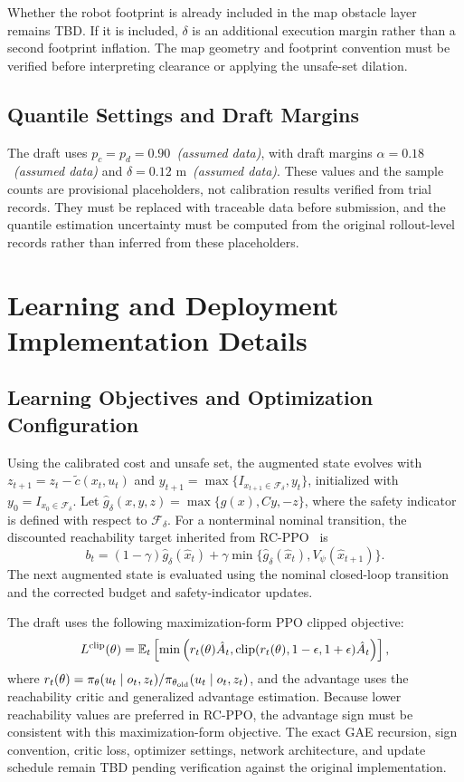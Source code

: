 \documentclass{article}
\begin{document}
Whether the robot footprint is already included in the map obstacle layer remains
\textsc{TBD}. If it is included, $\delta$ is an additional execution margin rather
than a second footprint inflation. The map geometry and footprint convention must
be verified before interpreting clearance or applying the unsafe-set dilation.

\subsection{Quantile Settings and Draft Margins}
The draft uses $p_c=p_d=0.90$~\textit{(assumed data)}, with draft margins
$\alpha=0.18$~\textit{(assumed data)} and $\delta=0.12$ m~\textit{(assumed data)}.
These values and the sample counts are provisional placeholders, not calibration
results verified from trial records. They must be replaced with traceable data
before submission, and the quantile estimation uncertainty must be computed from
the original rollout-level records rather than inferred from these placeholders.

\section{Learning and Deployment Implementation Details}
\label{app:learning_details}
\subsection{Learning Objectives and Optimization Configuration}
Using the calibrated cost and unsafe set, the augmented state evolves with
$z_{t+1}=z_t-\tilde c(x_t,u_t)$ and
$y_{t+1}=\max\{I_{x_{t+1}\in\mathcal{F}_\delta},y_t\}$, initialized with
$y_0=I_{x_0\in\mathcal{F}_\delta}$. Let
$\hat g_\delta(x,y,z)=\max\{g(x),Cy,-z\}$, where the safety indicator is defined
with respect to $\mathcal{F}_\delta$. For a nonterminal nominal transition,
the discounted reachability target inherited from RC-PPO~\citep{so2024} is
\begin{equation}
b_t=(1-\gamma)\hat g_\delta(\hat x_t)+\gamma\min\{
\hat g_\delta(\hat x_t),V_\psi(\hat x_{t+1})\}.
\end{equation}
The next augmented state is evaluated using the nominal closed-loop transition and
the corrected budget and safety-indicator updates.

The draft uses the following maximization-form PPO clipped objective:
\begin{equation}
L^{\rm clip}(\theta)=\mathbb{E}_t\left[\min\left(r_t(\theta)\hat A_t,
\operatorname{clip}(r_t(\theta),1-\epsilon,1+\epsilon)\hat A_t\right)\right],
\end{equation}
where $r_t(\theta)=\pi_\theta(u_t\mid o_t,z_t)/
\pi_{\theta_{\rm old}}(u_t\mid o_t,z_t)$, and the advantage uses the
reachability critic and generalized advantage estimation. Because lower
reachability values are preferred in RC-PPO, the advantage sign must be consistent
with this maximization-form objective. The exact GAE recursion, sign convention,
critic loss, optimizer settings, network architecture, and update schedule remain
\textsc{TBD} pending verification against the original implementation.
\end{document}
